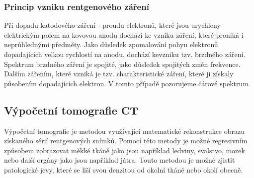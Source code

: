 \documentclass{thesis}%
\begin{document}
\subsubsection{Princip vzniku rentgenového záření}
Při dopadu katodového záření - proudu elektronů, které jsou urychleny elektrickým polem na kovovou anodu dochází ke vzniku záření, které proniká i neprůhlednými předměty. Jako důsledek zpomalování pohyu elektronů dopadajících velkou rychlostí na anodu, dochází kevzniku tzv. brzdného záření. Spektrum brzdného záření je spojité, jako důsledek spojitých změn frekvence. Dalším zářením, které vzniká je tzv. charakteristické záření, které ji získaly působením dopadajících elektron. V tomto případě pozorujeme čárové spektrum.
\subsection{Výpočetní tomografie CT}
Výpočetní tomografie je metodou využívající matematické rekonstrukce obrazu získaného sérií rentgenových snímků. Pomocí této metody je možné regresivním způsobem zobrazovat měkké tkáně jako jsou například ledviny, svalstvo, mozek nebo další orgány jako jsou například játra. Touto metodou je možné zjistit patologické jevy, které se liší svou denzitou od okolní tkáně nebo okolí obecně.
\end{document}
